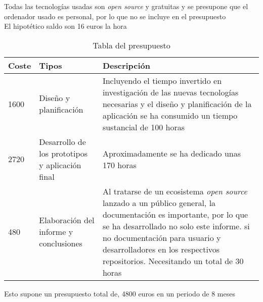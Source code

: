 Todas las tecnologías usadas son \emph{open source} y gratuitas y se presupone que el ordenador usado es personal, por lo que no se incluye en el presupuesto\\
El hipotético saldo son 16 euros la hora

\begin{comment}
\begin{center}
\begin{tabu} to 0.8\textwidth {| X[l] | X[l] | X[l] |}
 \hline
 \multicolumn{1}{|c|}{\bf Coste} & \multicolumn{1}{|c|}{\bf Tipos} & \multicolumn{1}{|c|}{\bf Descripción} \\
 \hline 4500 & Formación y Diseño & La formación en nuevas tecnologías y el diseño de la aplicación han consumido un tiempo sustancial de 300 horas\\
 \hline
 3000  & Desarrollo de los prototipos y aplicación final & Aproximadamente se ha dedicado unas 200 horas\\
 \hline
 120 & Elaboración del informe y conclusiones  & Al tratarse de un ecosistema \emph{open source} lanzado a un público general, la documentación es importante, por lo que se ha desarrollado no solo este informe. si no documentación para usuario y desarrolladores en los respectivos repositorios. \\
 \hline
\end{tabu}
\end{center}
\end{comment}
\begin{table}[H]
    \centering
    \begin{tabular}{|m{1cm}|m{4cm}|m{10cm}|}
    \hline
    \textbf{Coste} & \textbf{Tipos} & \textbf{Descripción}\\
    \hline
    1600 & Diseño y planificación & Incluyendo el tiempo invertido en investigación de las nuevas tecnologías necesarias y el diseño y planificación de la aplicación se ha consumido un tiempo sustancial de 100 horas\\
    \hline
    2720  & Desarrollo de los prototipos y aplicación final & Aproximadamente se ha dedicado unas 170 horas\\
    \hline
    480 & Elaboración del informe y conclusiones  & Al tratarse de un ecosistema \emph{open source} lanzado a un público general, la documentación es importante, por lo que se ha desarrollado no solo este informe. si no documentación para usuario y desarrolladores en los respectivos repositorios. Necesitando un total de 30 horas\\
    \hline
    \end{tabular}
    \caption{Tabla del presupuesto}
    \label{tab:budget}
\end{table}

\begin{comment}
   \begin{table}[htb]
   \centering
   \caption{Presupuesto}
   \label{table:presupuesto}
\end{table} 
\end{comment}

Esto supone un presupuesto total de, 4800 euros en un periodo de 8 meses
